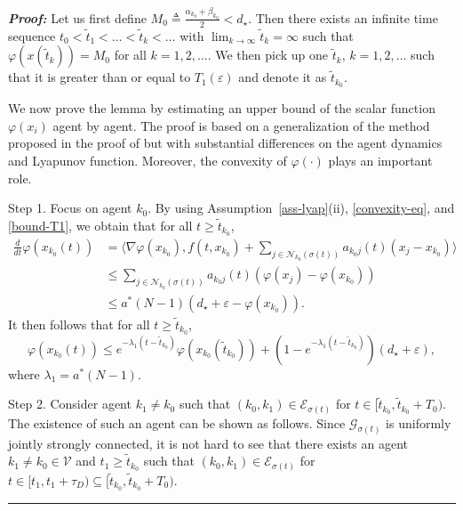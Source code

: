 \documentclass[a4paper, 11pt]{article}
\def \defn{\triangleq}
\newenvironment{IEEEproof}[1][\bf Proof]{\smallskip\par\noindent\textit{#1: }}{\hspace*{\fill} \rule{6pt}{6pt}\smallskip}
\newcommand{\eps}{\varepsilon}
\begin{document}
\begin{IEEEproof}
Let us first define $M_0 \defn \frac{\alpha_{k_0}+\beta_{k_0}}{2}< d_\star$.
Then there exists an infinite time sequence $t_0<\tilde{t}_1<\ldots<\tilde{t}_k < \ldots$
with $\lim_{k \rightarrow \infty}\tilde{t}_k=\infty$ such that $\varphi(x(\tilde{t}_k))=M_0$ for all $k=1,2,\ldots$.
We then pick up one $\tilde{t}_k$, $k=1,2,\ldots$ such that it is greater than or equal to $T_1(\eps)$
and denote it as $\tilde{t}_{k_0}$.

We now prove the lemma by estimating an upper bound of the scalar function $\varphi(x_i)$ agent by agent.
The proof is based on a generalization of the method proposed in the proof of \cite[Lemma~4.3]{shi-johansson-hong}
but with substantial differences on the agent dynamics and Lyapunov function. Moreover, the convexity of $\varphi(\cdot)$ plays an important role.

\noindent Step 1. Focus on agent $k_0$.
By using Assumption~\ref{ass-lyap}(ii), \eqref{convexity-eq}, and \eqref{bound-T1}, we obtain that for all $t \geq \tilde{t}_{k_0}$,
\begin{align}
\frac{d}{dt} \varphi(x_{k_0}(t))&=\big \langle \nabla \varphi(x_{k_0}), f(t,x_{k_0})+  \sum_{j \in \mathcal{N}_{k_0}(\sigma(t))}a_{k_0 j}(t)(x_j-x_{k_0}) \big \rangle  \nonumber \\
& \leq \sum _{j \in \mathcal{N}_{k_0}(\sigma(t))} a_{k_0 j}(t)  \left(\varphi(x_j)-\varphi(x_{k_0})\right) \nonumber\\
& \leq a^* (N-1) (d_\star+\eps -\varphi(x_{k_0})).\label{leaderless-k1}
\end{align}
It then follows that for all $t \geq \tilde{t}_{k_0}$,
\begin{equation}
\varphi(x_{k_0}(t)) \leq e^{-\lambda_1(t-\tilde{t}_{k_0})}  \varphi(x_{k_0}(\tilde{t}_{k_0}))+\left(1-e^{-\lambda_1(t-\tilde{t}_{k_0})}\right)(d_\star+\eps),\label{dis-k0}
\end{equation}
where $\lambda_1=a^* (N-1)$.

\vspace{2mm}

\noindent Step 2. Consider agent $k_1 \neq k_0$ such that $(k_0,k_1) \in \mathcal{E}_{\sigma(t)}$ for
$t \in [\tilde{t}_{k_0},\tilde{t}_{k_0}+T_0)$. The existence of such an agent can be shown as follows.
Since $\mathcal{G}_{\sigma(t)}$ is uniformly jointly strongly connected, it is not hard to see
that there exists an agent $k_1 \neq k_0 \in \mathcal{V}$ and $t_1 \geq \tilde{t}_{k_0}$ such that
$(k_0,k_1) \in \mathcal{E}_{\sigma(t)}$ for $t \in [t_1,t_1+\tau_D) \subseteq [\tilde{t}_{k_0},\tilde{t}_{k_0}+T_0)$.


\end{IEEEproof}
\end{document}
